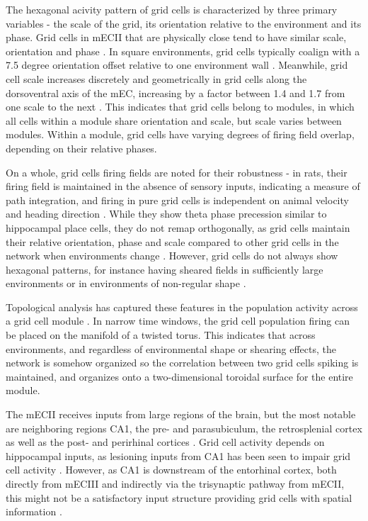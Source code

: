 \documentclass{article}
\begin{document}
    The hexagonal acivity pattern of grid cells is characterized by three primary variables - the scale of the grid, its orientation relative to the environment and its phase. Grid cells in mECII that are physically close tend to have similar scale, orientation and phase \parencite{Hafting2005}. In square environments, grid cells typically coalign with a 7.5 degree orientation offset relative to one environment wall \parencite{Stensola2015}. Meanwhile, grid cell scale increases discretely and geometrically in grid cells along the dorsoventral axis of the mEC, increasing by a factor between 1.4 and 1.7 from one scale to the next \parencite{Stensola2012}. This indicates that grid cells belong to modules, in which all cells within a module share orientation and scale, but scale varies between modules. Within a module, grid cells have varying degrees of firing field overlap, depending on their relative phases.

    On a whole, grid cells firing fields are noted for their robustness - in rats, their firing field is maintained in the absence of sensory inputs, indicating a measure of path integration, and firing in pure grid cells is independent on animal velocity and heading direction \parencite{Hafting2005}. While they show theta phase precession similar to hippocampal place cells, they do not remap orthogonally, as grid cells maintain their relative orientation, phase and scale compared to other grid cells in the network when environments change \parencite{Hafting2008, Fyhn2007}. However, grid cells do not always show hexagonal patterns, for instance having sheared fields in sufficiently large environments or in environments of non-regular shape \parencite{Stensola2015,Krupic2015}.

    Topological analysis has captured these features in the population activity across a grid cell module \parencite{Gardner2022}. In narrow time windows, the grid cell population firing can be placed on the manifold of a twisted torus. This indicates that across environments, and regardless of environmental shape or shearing effects, the network is somehow organized so the correlation between two grid cells spiking is maintained, and organizes onto a two-dimensional toroidal surface for the entire module.

    The mECII receives inputs from large regions of the brain, but the most notable are neighboring regions CA1, the pre- and parasubiculum, the retrosplenial cortex as well as the post- and perirhinal cortices \parencite{Kerr2007}. Grid cell activity depends on hippocampal inputs, as lesioning inputs from CA1 has been seen to impair grid cell activity \parencite{Bonnevie2013}. However, as CA1 is downstream of the entorhinal cortex, both directly from mECIII and indirectly via the trisynaptic pathway from mECII, this might not be a satisfactory input structure providing grid cells with spatial information \parencite{Tamamaki1993,Kerr2007,Witter2017}.
\end{document}
